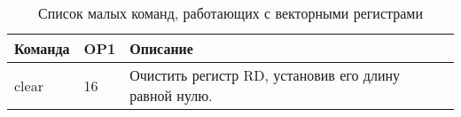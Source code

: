 \documentclass[forwardcom.tex]{subfiles}
\begin{document}
\begin{longtable} {|p{20mm}|p{8mm}|p{100mm}|}
\caption{Список малых команд, работающих с векторными регистрами}
\label{table:tinyInstructionsVector}  \\
\endfirsthead
\endhead
\hline
\bfseries Команда & \bfseries OP1 & \bfseries Описание \\ \hline
clear             & 16            & Очистить регистр RD, установив его длину равной нулю. \\
\end{longtable}
%
%
\end{document}
